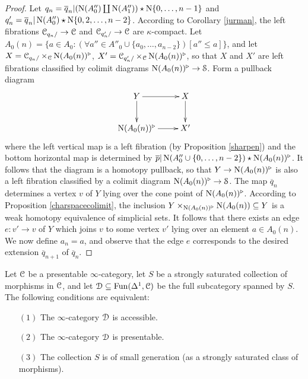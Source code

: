 \begin{proof}
Let $q_n = \overline{q}_n | ( \operatorname{N}(A''_0) \coprod \operatorname{N}(A''_1)) \star \operatorname{N} \{0, \ldots, n-1\}$ and
$q'_n = \overline{q}_n | \operatorname{N}(A''_0) \star \operatorname{N} \{0, 2, \ldots, n-2\}$.
According to Corollary \ref{jurman}, the left fibrations $\operatorname{\mathcal{C}}_{q_n/} \rightarrow \operatorname{\mathcal{C}}$
and $\operatorname{\mathcal{C}}_{q'_n/} \rightarrow \operatorname{\mathcal{C}}$ are $\kappa$-compact. Let 
$A_0(n) = \{ a \in A_0: (\forall a'' \in A''_0 \cup \{ a_0, \ldots, a_{n-2} \}) [a'' \leq a] \}$, and let
$X = \operatorname{\mathcal{C}}_{q_n/} \times_{\operatorname{\mathcal{C}}} \operatorname{N}(A_0(n))^{\triangleright}$, $X' = \operatorname{\mathcal{C}}_{q'_n/} \times_{\operatorname{\mathcal{C}}} \operatorname{N}(A_0(n))^{\triangleright}$, so that $X$ and $X'$ are left fibrations classified by colimit diagrams $\operatorname{N}(A_0(n))^{\triangleright} \rightarrow \operatorname{\mathcal{S}}$. Form a pullback diagram
$$ \xymatrix{ Y \ar[r] \ar[d] & X \ar[d] \\
\Nerve(A_0(n))^{\triangleright} \ar[r] & X' }$$
where the left vertical map is a left fibration (by Proposition \ref{sharpen}) and the bottom horizontal map is determined by $\overline{p} |  \operatorname{N}(A''_0 \cup \{0,\ldots, n-2\}) \star \operatorname{N} (A_0(n))^{\triangleright}$. It follows that the diagram is a homotopy pullback, so that 
$Y \rightarrow \operatorname{N}(A_0(n))^{\triangleright}$ is also a left fibration classified by
a colimit diagram $\operatorname{N}(A_0(n))^{\triangleright} \rightarrow \operatorname{\mathcal{S}}$. The map
$\overline{q}_{n}$ determines a vertex $v$ of $Y$ lying over the cone point of $\operatorname{N} (A_0(n))^{\triangleright}$. According to Proposition \ref{charspacecolimit}, the inclusion $Y \times_{ \operatorname{N}(A_0(n))^{\triangleright} } \operatorname{N}(A_0(n)) \subseteq Y$ is a weak homotopy equivalence of simplicial sets. It follows that there exists an edge $e: v' \rightarrow v$ of $Y$ which joins
$v$ to some vertex $v'$ lying over an element $a \in A_0(n)$. We now define $a_n = a$, and
observe that the edge $e$ corresponds to the desired extension $\overline{q}_{n+1}$ of
$\overline{q}_n$.
\end{proof}

\begin{lemma}\label{perry}
Let $\operatorname{\mathcal{C}}$ be a presentable $\infty$-category, let $S$ be a strongly saturated collection of morphisms in $\operatorname{\mathcal{C}}$, and let $\operatorname{\mathcal{D}} \subseteq \operatorname{Fun}(\Delta^1,\operatorname{\mathcal{C}})$ be the full subcategory spanned by $S$. The following conditions are equivalent:
\begin{itemize}
\item[$(1)$] The $\infty$-category $\operatorname{\mathcal{D}}$ is accessible.
\item[$(2)$] The $\infty$-category $\operatorname{\mathcal{D}}$ is presentable.
\item[$(3)$] The collection $S$ is of small generation (as a strongly saturated class of morphisms).
\end{itemize}
\end{lemma}

